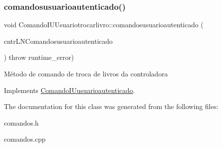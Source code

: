 \subsubsection{\texorpdfstring{comandosusuarioautenticado()}{comandosusuarioautenticado()}}
{\footnotesize\ttfamily void Comando\+I\+U\+Usuariotrocarlivro\+::comandosusuarioautenticado (\begin{DoxyParamCaption}\item[{\hyperlink{classILNComandosusuarioautenticado}{I\+L\+N\+Comandosusuarioautenticado} $\ast$}]{cntr\+L\+N\+Comandosusuarioautenticado }\end{DoxyParamCaption}) throw  runtime\+\_\+error) \hspace{0.3cm}{\ttfamily [virtual]}}

Método de comando de troca de livros da controladora 

Implements \hyperlink{classComandoIUusuarioautenticado}{Comando\+I\+Uusuarioautenticado}.



The documentation for this class was generated from the following files\+:\begin{DoxyCompactItemize}
\item 
comandos.\+h\item 
comandos.\+cpp\end{DoxyCompactItemize}
